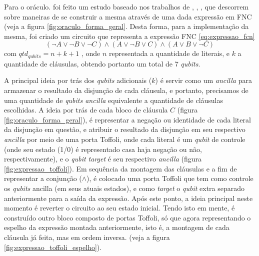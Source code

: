 \documentclass[12pt]{article}
\begin{document}
Para o oráculo. foi feito um estudo baseado nos trabalhos de \cite{fernandes2:19}, \cite{fernandes:19}, \cite{parallelAndDistributed}, que descorrem sobre maneiras de se construir a mesma através de uma dada expressão em FNC (veja a figura \ref{fig:oraculo_forma_geral}. Desta forma, para a implementação da mesma, foi criado um circuito que representa a expressão FNC \ref{eq:expressao_fcn} 
\begin{equation}
(\neg A \lor \neg B \lor \neg C) \land (A \lor \neg B \lor C) \land (A \lor B \lor \neg C)\label{eq:expressao_fcn}
\end{equation}
com $qtd_{\textit{qubits}} = n + k + 1$ , onde $n$ representada a quantidade de literais, e $k$ a quantidade de cláusulas, obtendo portanto um total de 7 \textit{qubits}.

A principal ideia por trás dos \textit{qubits} adicionais ($k$) é servir como um \textit{ancilla} para armazenar o resultado da disjunção de cada cláusula, e portanto, precisamos de uma quantidade de \textit{qubits ancilla} equivalente a quantidade de cláusulas escolhidas. A ideia por trás de cada bloco de cláusula $C$ (figura \ref{fig:oraculo_forma_geral}), é representar a negação ou identidade de cada literal da disjunção em questão, e atribuir o resultado da disjunção em seu respectivo \textit{ancilla} por meio de uma porta Toffoli, onde cada literal é um \textit{qubit} de controle (onde seu estado (1/0) é representado casa haja negação ou não, respectivamente), e o \textit{qubit target} é seu respectivo \textit{ancilla}  (figura \ref{fig:expressao_toffoli}). Em sequência da montagem das cláusulas e a fim de representar a conjunção ($\land$), é colocado uma porta Toffoli que tem como controle os \textit{qubits} ancilla (em seus atuais estados), e como \textit{target} o \textit{qubit} extra separado anteriormente para a saída da expressão. 
Após este ponto, a ideia principal neste momento é reverter o circuito ao seu estado inicial. Tendo isto em mente, é construído outro bloco composto de portas Toffoli, só que agora representando o espelho da expressão montada anteriormente, isto é, a montagem de cada cláusula já feita, mas em ordem inversa. (veja a figura \ref{fig:expressao_toffoli_espelho}).
\end{document}
